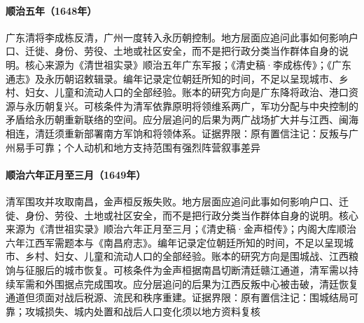 \hypertarget{social:EQ-1648-LI-CHENGDONG}{}\paragraph{顺治五年（1648年）}广东清将李成栋反清，广州一度转入永历朝控制。地方层面应追问此事如何影响户口、迁徙、身份、劳役、土地或社区安全，而不是把行政分类当作群体自身的说明。核心来源为《清世祖实录》顺治五年广东军报；《清史稿·李成栋传》；《广东通志》及永历朝诏敕辑录。编年记录定位朝廷所知的时间，不足以呈现城市、乡村、妇女、儿童和流动人口的全部经验。账本的研究方向是广东降将政治、港口资源与永历朝复兴。可核条件为清军依靠原明将领维系两广，军功分配与中央控制的矛盾给永历朝重新联络的空间。应分层追问的后果为两广战场扩大并与江西、闽海相连，清廷须重新部署南方军饷和将领体系。证据界限：原有置信注记：反叛与广州易手可靠；个人动机和地方支持范围有强烈阵营叙事差异
\hypertarget{social:EQ-1649-NANCHANG}{}\paragraph{顺治六年正月至三月（1649年）}清军围攻并攻取南昌，金声桓反叛失败。地方层面应追问此事如何影响户口、迁徙、身份、劳役、土地或社区安全，而不是把行政分类当作群体自身的说明。核心来源为《清世祖实录》顺治六年正月至三月；《清史稿·金声桓传》；内阁大库顺治六年江西军需题本与《南昌府志》。编年记录定位朝廷所知的时间，不足以呈现城市、乡村、妇女、儿童和流动人口的全部经验。账本的研究方向是围城战、江西粮饷与征服后的城市恢复。可核条件为金声桓据南昌切断清廷赣江通道，清军需以持续军需和外围据点完成围攻。应分层追问的后果为江西反叛中心被击破，清廷恢复通道但须面对战后税源、流民和秩序重建。证据界限：原有置信注记：围城结局可靠；攻城损失、城内处置和战后人口变化须以地方资料复核
